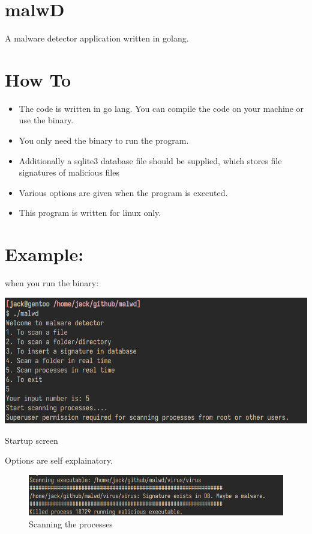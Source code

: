 \documentclass[11pt]{article}
\date{\today}
\title{}
\begin{document}
\tableofcontents

\section{malwD}
\label{sec:orgcd99897}
A malware detector application written in golang.
\section{How To}
\label{sec:org98509a1}
\begin{itemize}
\item The code is written in go lang. You can compile the code on your machine or use the binary.
\item You only need the binary to run the program.
\item Additionally a sqlite3 database file should be supplied, which stores file signatures of malicious files
\item Various options are given when the program is executed.
\item This program is written for linux only.
\end{itemize}
\section{Example:}
\label{sec:orga741bb9}
when you run the binary:
\begin{center}
\includegraphics[width=.9\linewidth]{./images/3.png}
\caption{\label{fig:org388f7b4}Startup screen}
\end{center}
Options are self explainatory.

\begin{figure}[htbp]
\centering
\includegraphics[width=.9\linewidth]{./images/2.png}
\caption{\label{fig:org4866208}Scanning the processes}
\end{figure}
\end{document}
